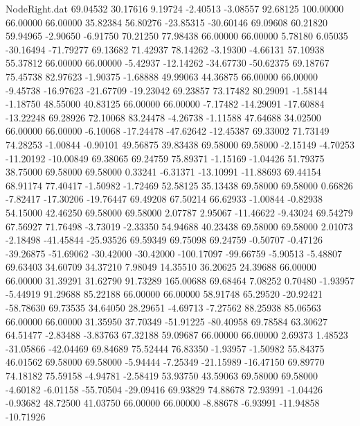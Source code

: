 \begin{filecontents}{NodeRight.dat}
  69.04532   30.17616    9.19724    -2.40513   -3.08557   92.68125  100.00000   66.00000   66.00000   35.82384   56.80276  -23.85315  -30.60146
  69.09608   60.21820   59.94965    -2.90650   -6.91750   70.21250   77.98438   66.00000   66.00000    5.78180    6.05035  -30.16494  -71.79277
  69.13682   71.42937   78.14262    -3.19300   -4.66131   57.10938   55.37812   66.00000   66.00000   -5.42937  -12.14262  -34.67730  -50.62375
  69.18767   75.45738   82.97623    -1.90375   -1.68888   49.99063   44.36875   66.00000   66.00000   -9.45738  -16.97623  -21.67709  -19.23042
  69.23857   73.17482   80.29091    -1.58144   -1.18750   48.55000   40.83125   66.00000   66.00000   -7.17482  -14.29091  -17.60884  -13.22248
  69.28926   72.10068   83.24478    -4.26738   -1.11588   47.64688   34.02500   66.00000   66.00000   -6.10068  -17.24478  -47.62642  -12.45387
  69.33002   71.73149   74.28253    -1.00844   -0.90101   49.56875   39.83438   69.58000   69.58000   -2.15149   -4.70253  -11.20192  -10.00849
  69.38065   69.24759   75.89371    -1.15169   -1.04426   51.79375   38.75000   69.58000   69.58000    0.33241   -6.31371  -13.10991  -11.88693
  69.44154   68.91174   77.40417    -1.50982   -1.72469   52.58125   35.13438   69.58000   69.58000    0.66826   -7.82417  -17.30206  -19.76447
  69.49208   67.50214   66.62933    -1.00844   -0.82938   54.15000   42.46250   69.58000   69.58000    2.07787    2.95067  -11.46622   -9.43024
  69.54279   67.56927   71.76498    -3.73019   -2.33350   54.94688   40.23438   69.58000   69.58000    2.01073   -2.18498  -41.45844  -25.93526
  69.59349   69.75098   69.24759    -0.50707   -0.47126  -39.26875  -51.69062  -30.42000  -30.42000 -100.17097  -99.66759   -5.90513   -5.48807
  69.63403   34.60709   34.37210     7.98049   14.35510   36.20625   24.39688   66.00000   66.00000   31.39291   31.62790   91.73289  165.00688
  69.68464    7.08252    0.70480    -1.93957   -5.44919   91.29688   85.22188   66.00000   66.00000   58.91748   65.29520  -20.92421  -58.78630
  69.73535   34.64050   28.29651    -4.69713   -7.27562   88.25938   85.06563   66.00000   66.00000   31.35950   37.70349  -51.91225  -80.40958
  69.78584   63.30627   64.51477    -2.83488   -3.83763   67.32188   59.09687   66.00000   66.00000    2.69373    1.48523  -31.05866  -42.04469
  69.84689   75.52444   76.83350    -1.93957   -1.50982   55.84375   46.01562   69.58000   69.58000   -5.94444   -7.25349  -21.15989  -16.47150
  69.89770   74.18182   75.59158    -4.94781   -2.58419   53.93750   43.59063   69.58000   69.58000   -4.60182   -6.01158  -55.70504  -29.09416
  69.93829   74.88678   72.93991    -1.04426   -0.93682   48.72500   41.03750   66.00000   66.00000   -8.88678   -6.93991  -11.94858  -10.71926

\end{filecontents}
